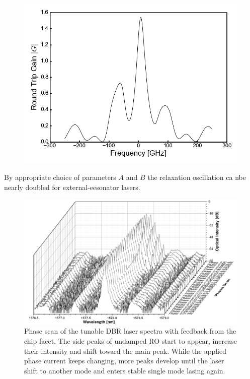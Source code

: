 \begin{figure}[ht]
    \centering
    \includegraphics[width=.7\linewidth]{figures/feedback_introduced_detuned_loading_principle.png}
    \caption{}
    \label{fig:feedback_introduced_detuned_loading_principle}
\end{figure}

By appropriate choice of parameters $A$ and $B$ the relaxation oscillation ca nbe nearly doubled for external-eesonator lasers.

\begin{figure}[ht]
    \centering
    \includegraphics[width=.8\linewidth]{figures/Undamped_RO_phase_scan_grating_4621.png}
    \caption{Phase scan of the tunable DBR laser spectra with feedback from the chip facet. The side peaks of undamped RO start to appear, increase their intensity and shift toward the main peak. While the applied phase current keeps changing, more peaks develop until the laser shift to another mode and enters stable single mode lasing again.}
    \label{fig:undamped_RO_phase_scan}
\end{figure}

